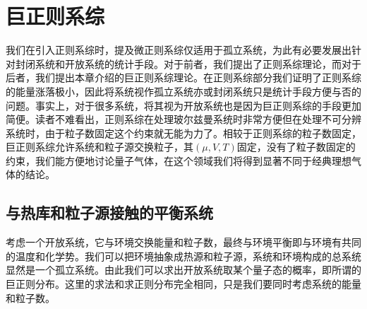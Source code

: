 \documentclass[../../main.tex]{subfiles}
\begin{document}
\chapter{巨正则系综}
我们在引入正则系综时，提及微正则系综仅适用于孤立系统，为此有必要发展出针对封闭系统和开放系统的统计手段。对于前者，我们提出了正则系综理论，而对于后者，我们提出本章介绍的巨正则系综理论。在正则系综部分我们证明了正则系综的能量涨落极小，因此将系统视作孤立系统亦或封闭系统只是统计手段方便与否的问题。事实上，对于很多系统，将其视为开放系统也是因为巨正则系综的手段更加简便。读者不难看出，正则系综在处理玻尔兹曼系统时非常方便但在处理不可分辨系统时，由于粒子数固定这个约束就无能为力了。相较于正则系综的粒子数固定，巨正则系综允许系统和粒子源交换粒子，其\((\mu,V,T)\)固定，没有了粒子数固定的约束，我们能方便地讨论量子气体，在这个领域我们将得到显著不同于经典理想气体的结论。

\section{与热库和粒子源接触的平衡系统}
考虑一个开放系统，它与环境交换能量和粒子数，最终与环境平衡即与环境有共同的温度和化学势。我们可以把环境抽象成热源和粒子源，系统和环境构成的总系统显然是一个孤立系统。由此我们可以求出开放系统取某个量子态的概率，即所谓的巨正则分布。这里的求法和求正则分布完全相同，只是我们要同时考虑系统的能量和粒子数。
\end{document}
